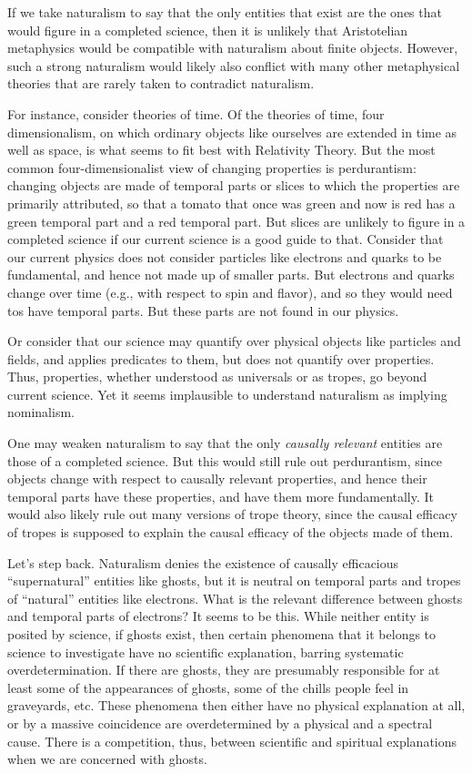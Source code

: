 If we take naturalism to say that the only entities that exist are the ones that would figure in a completed science,
then it is unlikely that Aristotelian metaphysics would be compatible with naturalism about finite objects. However,
such a strong naturalism would likely also conflict with many other metaphysical theories that are rarely taken to 
contradict naturalism. 

For instance, consider theories of time. Of the theories of time, four dimensionalism, on which
ordinary objects like ourselves are extended in time as well as space, is what seems to fit best with Relativity Theory. 
But the most common four-dimensionalist view of changing properties is perdurantism: changing objects are made of temporal parts or
slices to which the properties are primarily attributed, so that a tomato that once was green and now is red has a green temporal part
and a red temporal part. But slices are unlikely to figure in a completed science if
our current science is a good guide to that. Consider that our current physics does not consider particles
like electrons and quarks to be fundamental, and hence not made up of smaller parts. But electrons and quarks change over
time (e.g., with respect to spin and flavor), and so they would need tos have temporal parts.  But these parts are not found
in our physics. 

Or consider that our science may quantify over physical objects like particles and fields, and applies predicates to them, but 
does not quantify over properties. Thus, properties, whether understood as universals or as tropes, go beyond current science.
Yet it seems implausible to understand naturalism as implying nominalism.

One may weaken naturalism to say that the only \textit{causally relevant} entities are those of a completed science. But 
this would still rule out perdurantism, since objects change with respect to causally relevant properties, and hence their
temporal parts have these properties, and have them more fundamentally. It would also likely rule out many versions of trope
theory, since the causal efficacy of tropes is supposed to explain the causal efficacy of the objects made of them.

Let's step back. Naturalism denies the existence of causally efficacious ``supernatural'' entities like 
ghosts, but it is neutral on temporal parts and tropes of ``natural'' entities like electrons. 
What is the relevant difference between ghosts and temporal parts of electrons? It seems to be this. While
neither entity is posited by science, if ghosts exist, then certain phenomena that it belongs to science 
to investigate have no scientific explanation, barring systematic overdetermination. If there are ghosts,
they are presumably responsible for at least some of the appearances of ghosts, some of the chills people
feel in graveyards, etc. These phenomena then either have no physical explanation at all, or by a massive
coincidence are overdetermined by a physical and a spectral cause. There is a competition, thus, between 
scientific and spiritual explanations when we are concerned with ghosts. 

